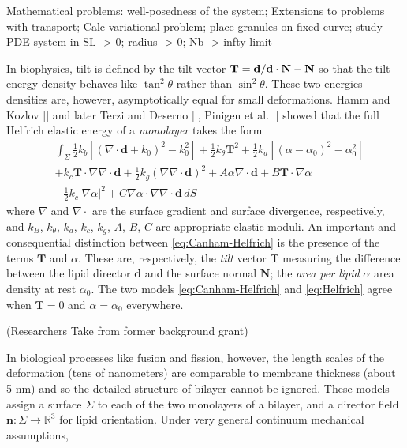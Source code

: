 \begin{remark}
  Mathematical problems: well-posedness of the system;
  Extensions to problems with transport;
  Calc-variational problem; place granules on fixed curve; study PDE system in
  SL -> 0; radius -> 0; Nb -> infty limit
\end{remark}
\begin{remark}
  In biophysics, tilt is defined by the tilt vector
  $\mathbf{T} = \mathbf{d}/\mathbf{d}\cdot \mathbf{N} - \mathbf{N}$ so that the tilt energy density
  behaves like $\tan^2 \theta$ rather than $\sin^2 \theta$.
  These two energies densities are, however, asymptotically equal
  for small deformations.
Hamm and Kozlov [] and later Terzi and Deserno [], Pinigen et al. []
showed that the full Helfrich elastic energy of a \emph{monolayer} takes the form
\begin{equation}
\label{eq:Helfrich}
  \begin{aligned}
 &\int_{\Sigma}
\tfrac{1}{2}k_{b}[(\nabla \cdot \mathbf{d} + k_{0})^{2} -  k^{2}_{0}]  
+ \tfrac{1}{2}k_{\theta}\mathbf{T}^{2} + \tfrac{1}{2}k_a[(\alpha - \alpha_0)^2 - \alpha_0^2] \\
&+ k_{c}\textbf{T} \cdot \nabla \nabla \cdot \mathbf{d}  + \tfrac{1}{2}k_{g}(\nabla \nabla \cdot \mathbf{d})^{2}
 + A\alpha \nabla \cdot \mathbf{d}
+ B \mathbf{T} \cdot \nabla \alpha \\
&- \tfrac{1}{2}k_c |\nabla \alpha|^2 + C \nabla \alpha \cdot \nabla \nabla \cdot \mathbf{d}\,dS
\end{aligned}
\end{equation}
where $\nabla$ and $\nabla \cdot$ are the surface gradient and surface divergence,
respectively, and $k_B$, $k_{\theta}$, $k_a$, $k_c$, $k_g$, $A$, $B$, $C$ are
appropriate elastic moduli.  An important and consequential distinction between
\eqref{eq:Canham-Helfrich} is the presence of the terms $\mathbf{T}$ and $\alpha$.
These are, respectively, the \emph{tilt} vector $\mathbf{T}$ measuring
the difference between the lipid director $\mathbf{d}$ and the surface normal
$\mathbf{N}$; the \emph{area per lipid} $\alpha$ area density at rest $\alpha_0$.
The two models \eqref{eq:Canham-Helfrich} and \eqref{eq:Helfrich} agree
when $\mathbf{T} = 0$ and $\alpha = \alpha_0$ everywhere.
\end{remark}



(Researchers Take from former background grant)

In biological processes like fusion and fission, however, the length scales of the
deformation (tens of nanometers) are comparable to membrane thickness (about 5 nm)
and so the detailed structure of bilayer cannot be ignored.
These models assign a surface $\Sigma$ to each of the two monolayers
of a bilayer, and a director field $\mathbf{n}:\Sigma \to \mathbb{R}^3$
for lipid orientation. Under very general continuum mechanical assumptions,

